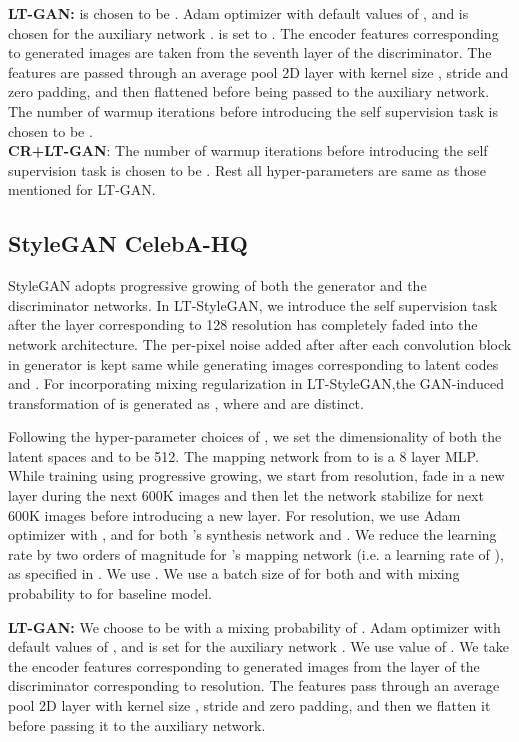 \documentclass[10pt,twocolumn,letterpaper]{article}
\begin{document}
\textbf{LT-GAN:}
 is chosen to be . Adam optimizer with default values of ,  and  is chosen for the auxiliary network .  is set to . The encoder features  corresponding to generated images  are taken from the seventh layer of the discriminator. The features  are passed through an average pool 2D layer with kernel size , stride  and zero padding, and then flattened before being passed to the auxiliary network. The number of warmup iterations  before introducing the self supervision task is chosen to be . \\

\vspace{-8pt}
\textbf{CR+LT-GAN}:
The number of warmup iterations  before introducing the self supervision task is chosen to be . Rest all hyper-parameters are same as those mentioned for LT-GAN.


\subsection{StyleGAN CelebA-HQ}

StyleGAN adopts progressive growing of both the generator and the  discriminator networks. In LT-StyleGAN, we introduce the self supervision task after the layer corresponding to 128 resolution has completely faded into the network architecture. The per-pixel noise added after after each convolution block in generator is kept same while generating images corresponding to latent codes  and . For incorporating mixing regularization in LT-StyleGAN,the GAN-induced transformation of  is generated as , where  and  are distinct.


Following the hyper-parameter choices of \cite{stylegan2019karras}, we set the dimensionality of both the latent spaces  and  to be 512. The mapping network from  to  is a 8 layer MLP. While training using progressive growing, we start from  resolution, fade in a new layer during the next 600K images and then let the network stabilize for next 600K images before introducing a new layer. For  resolution, we use Adam optimizer with ,  and  for both 's synthesis network and . We reduce the learning rate by two orders of magnitude for 's mapping network (i.e. a learning rate of ), as specified in \cite{stylegan2019karras}. We use . We use a batch size of  for both  and  with mixing probability to  for baseline model.

\textbf{LT-GAN:}
We choose  to be  with a mixing probability of . Adam optimizer with default values of ,  and  is set for the auxiliary network . We use  value of . We take the encoder features  corresponding to generated images  from the layer of the discriminator corresponding to  resolution. The features  pass through an average pool 2D layer with kernel size , stride  and zero padding, and then we flatten it before passing it to the auxiliary network. 
\end{document}
